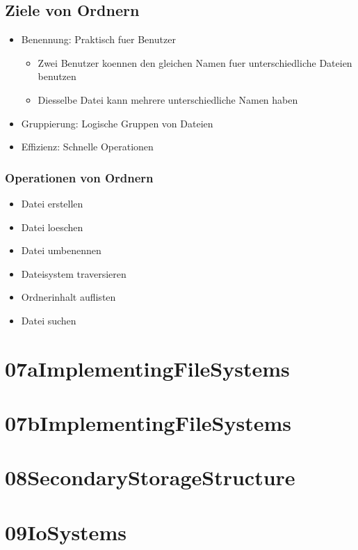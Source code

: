 \documentclass[a4paper]{scrreprt}
\begin{document}
\section{Ziele von Ordnern}
\begin{itemize}
	\item Benennung: Praktisch fuer Benutzer
		\begin{itemize}
			\item Zwei Benutzer koennen den gleichen Namen fuer unterschiedliche Dateien benutzen
			\item Diesselbe Datei kann mehrere unterschiedliche Namen haben
		\end{itemize}
	\item Gruppierung: Logische Gruppen von Dateien
	\item Effizienz: Schnelle Operationen
\end{itemize}

\subsection{Operationen von Ordnern}
\begin{itemize}
	\item Datei erstellen
	\item Datei loeschen
	\item Datei umbenennen
	\item Dateisystem traversieren
	\item Ordnerinhalt auflisten
	\item Datei suchen
\end{itemize}








\chapter{07aImplementingFileSystems}
\chapter{07bImplementingFileSystems}
\chapter{08SecondaryStorageStructure}
\chapter{09IoSystems}
\end{document}
